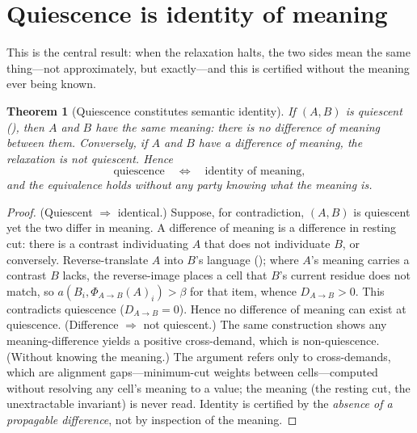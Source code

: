 \documentclass[11pt,a4paper]{article}
\theoremstyle{thmstyle}
\newtheorem{theorem}{Theorem}[section]
\theoremstyle{definition}
\theoremstyle{remark}
\newcommand{\flo}{\beta}               %
\newcommand{\align}{a}                 %
\newcommand{\colA}{A}                  %
\newcommand{\colB}{B}                  %
\newcommand{\demand}{D}                %
\newcommand{\relax}{\Phi}              %
\begin{document}
\section{Quiescence is identity of meaning}
\label{sec:identity}

This is the central result: when the relaxation halts, the two sides mean the
same thing---not approximately, but exactly---and this is certified without
the meaning ever being known.

\begin{theorem}[Quiescence constitutes semantic identity]
\label{thm:quiescence-identity}
If $(\colA,\colB)$ is quiescent (), then $\colA$ and
$\colB$ have the same meaning: there is no difference of meaning between them.
Conversely, if $\colA$ and $\colB$ have a difference of meaning, the relaxation
is not quiescent. Hence
\[
\text{quiescence}\quad\Longleftrightarrow\quad\text{identity of meaning},
\]
and the equivalence holds without any party knowing what the meaning is.
\end{theorem}

\begin{proof}
\textup{(Quiescent $\Rightarrow$ identical.)} Suppose, for contradiction,
$(\colA,\colB)$ is quiescent yet the two differ in meaning. A difference of
meaning is a difference in resting cut: there is a contrast individuating
$\colA$ that does not individuate $\colB$, or conversely. Reverse-translate
$\colA$ into $\colB$'s language (); where $\colA$'s meaning
carries a contrast $\colB$ lacks, the reverse-image places a cell that
$\colB$'s current residue does not match, so $\align(\colB_i,
\relax_{\colA\to\colB}(\colA)_i)>\flo$ for that item, whence
$\demand_{\colA\to\colB}>0$. This contradicts quiescence
($\demand_{\colA\to\colB}=0$). Hence no difference of meaning can exist at
quiescence. \textup{(Difference $\Rightarrow$ not quiescent.)} The same
construction shows any meaning-difference yields a positive cross-demand,
which is non-quiescence. \textup{(Without knowing the meaning.)} The argument
refers only to cross-demands, which are alignment gaps---minimum-cut weights
between cells---computed without resolving any cell's meaning to a value; the
meaning (the resting cut, the unextractable invariant) is never read. Identity
is certified by the \emph{absence of a propagable difference}, not by
inspection of the meaning.
\end{proof}
\end{document}

